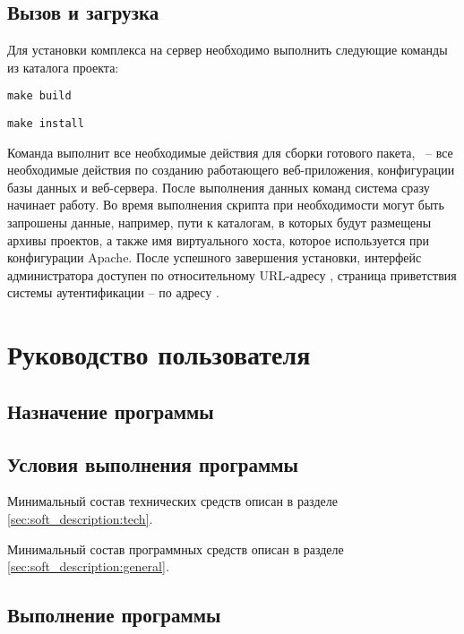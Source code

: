 \subsection{Вызов и загрузка}

Для установки комплекса на сервер необходимо выполнить следующие команды из каталога проекта:

\begin{lscommand}\verb+make build+\end{lscommand}
\begin{lscommand}\verb+make install+\end{lscommand}

\noindent Команда  выполнит все необходимые действия для сборки готового пакета, ~-- все необходимые действия по созданию работающего веб-приложения, конфигурации базы данных и веб-сервера. После выполнения данных команд система сразу начинает работу. Во время выполнения скрипта при необходимости могут быть запрошены данные, например, пути к каталогам, в которых будут размещены архивы проектов, а также имя виртуального хоста, которое используется при конфигурации Apache. После успешного завершения установки, интерфейс администратора доступен по относительному URL-адресу , страница приветствия системы аутентификации -- по адресу .

\section{Руководство пользователя}
\label{sec:man}

\subsection{Назначение программы}

\subsection{Условия выполнения программы}

Минимальный состав технических средств описан в разделе \ref{sec:soft_description:tech}.

Минимальный состав программных средств описан в разделе \ref{sec:soft_description:general}.

\subsection{Выполнение программы}



